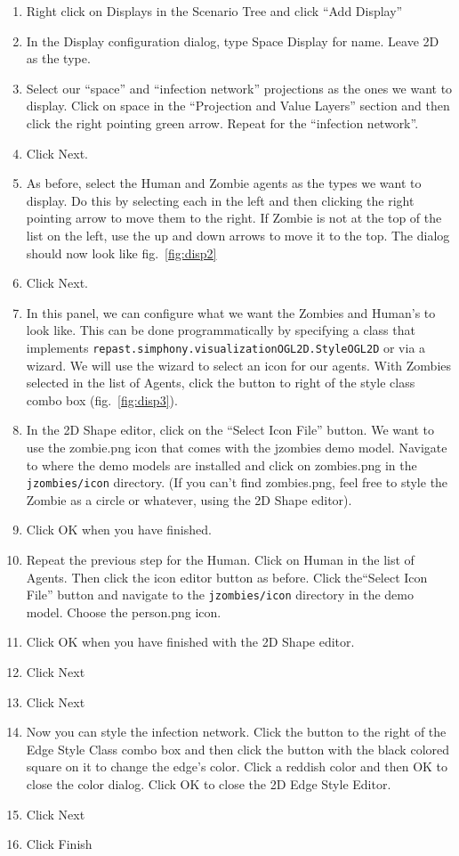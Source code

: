 \documentclass[11pt]{amsart}
\begin{document}
\vspace{.2in}
\begin{enumerate}
\item Right click on Displays in the Scenario Tree and click ``Add Display''
\item In the Display configuration dialog, type Space Display for name. Leave 2D as the type.
\item Select our ``space'' and ``infection network'' projections as the ones we want to display. Click on space in the ``Projection and Value Layers'' section and then click the right pointing green arrow. Repeat for the ``infection network''.
\item Click Next.
\item As before, select the Human and Zombie agents as the types we want to display. Do this by selecting each in the left and then clicking the right pointing arrow to move them to the right. If Zombie is not at the top of the list on the left, use the up and down arrows to move it to the top. The dialog should now look like fig.~\ref{fig:disp2}
\item Click Next.
\item In this panel, we can configure what we want the Zombies and Human's to look like. This can be done programmatically by specifying a class that implements \texttt{repast.simphony.visualizationOGL2D.StyleOGL2D} or via a wizard. We will use the wizard to select an icon for our agents. With Zombies selected in the list of Agents, click the button to right of the style class combo box (fig.~\ref{fig:disp3}).
\item In the 2D Shape editor, click on the ``Select Icon File'' button. We want to use the zombie.png icon that comes with the jzombies demo model. Navigate to where the demo models are installed and click on zombies.png in the \texttt{jzombies/icon} directory. (If you can't find zombies.png, feel free to style the Zombie as a circle or whatever, using the 2D Shape editor).
\item Click OK when you have finished.
\item Repeat the previous step for the Human. Click on Human in the list of Agents. Then click the icon editor button as before. Click the``Select Icon File'' button and navigate to the \texttt{jzombies/icon} directory in the demo model. Choose the person.png icon.
\item Click OK when you have finished with the 2D Shape editor.
\item Click Next
\item Click Next
\item Now you can style the infection network. Click the button to the right of the Edge Style Class combo box and then click the button with the black colored square on it to change the edge's color. Click a reddish color and then OK to close the color dialog. Click OK to close the 2D Edge Style Editor.
\item Click Next
\item Click Finish
\end{enumerate}
\vspace{.2in}
\end{document}
